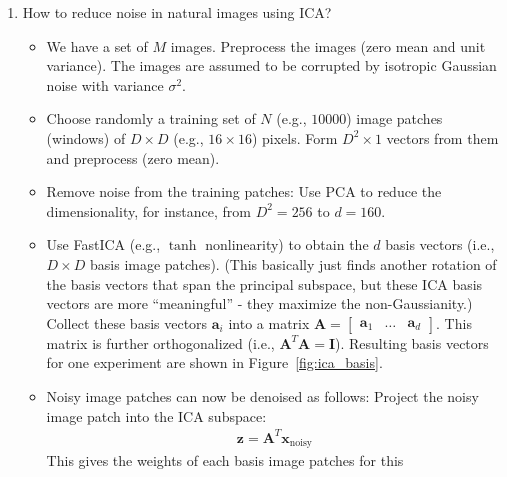\begin{enumerate}
\item How to reduce noise in natural images using ICA?


  \begin{solution}

    \begin{itemize}
    \item We have a set of $M$ images. Preprocess the images (zero
      mean and unit variance).  The images are assumed to be corrupted
      by isotropic Gaussian noise with variance $\sigma^2$.
    \item Choose randomly a training set of $N$ (e.g., $10000$) image
      patches (windows) of $D \times D$ (e.g., $16 \times 16$) pixels.
      Form $D^2 \times 1$ vectors from them and preprocess (zero
      mean).
    \item Remove noise from the training patches: Use PCA to reduce
      the dimensionality, for instance, from $D^2=256$ to $d=160$.
    \item Use FastICA (e.g., $\tanh$ nonlinearity) to obtain the $d$
      basis vectors (i.e., $D \times D$ basis image patches).  (This
      basically just finds another rotation of the basis vectors that
      span the principal subspace, but these ICA basis vectors are
      more ``meaningful'' - they maximize the non-Gaussianity.)
      Collect these basis vectors $\mathbf{a}_i$ into a matrix
      $\mathbf{A} = \begin{bmatrix} \mathbf{a}_1 & \ldots &
        \mathbf{a}_d \end{bmatrix}$.  This matrix is further
      orthogonalized (i.e., $\mathbf{A}^T\mathbf{A}=\mathbf{I}$).
      Resulting basis vectors for one experiment are shown in
      Figure~\ref{fig:ica_basis}.
    \item Noisy image patches can now be denoised as follows: Project
      the noisy image patch into the ICA subspace:
      \begin{align*}
        \mathbf{z} = \mathbf{A}^T \mathbf{x}_{\text{noisy}}
      \end{align*}
      This gives the weights of each basis image patches for this

\end{itemize}
\end{solution}
\end{enumerate}
